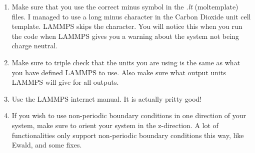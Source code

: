 \documentclass[twoside,english]{uiofysmaster}
\begin{document}
\begin{enumerate}
 \item Make sure that you use the correct minus symbol in the \textit{.lt} (moltemplate) files. I managed to use a long minus character in the Carbon Dioxide unit cell template. LAMMPS skips the character. You will notice this when you run the code when LAMMPS gives you a warning about the system not being charge neutral.
 \item Make sure to triple check that the units you are using is the same as what you have defined LAMMPS to use. Also make sure what output units LAMMPS will give for all outputs.
 \item Use the LAMMPS internet manual. It is actually pritty good!
 \item If you wish to use non-periodic boundary conditions in one direction of your system, make sure to orient your system in the z-direction. A lot of functionalities only support non-periodic boundary conditions this way, like Ewald, and some fixes.
\end{enumerate}
\end{document}
